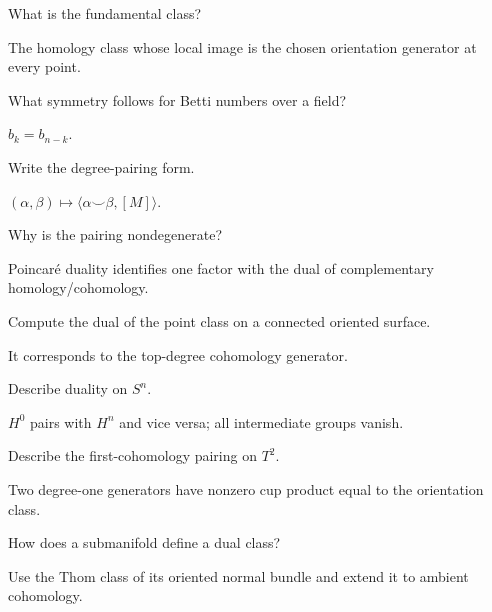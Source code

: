 \begin{problem}
What is the fundamental class?
\end{problem}
\begin{solution}
The homology class whose local image is the chosen orientation generator at every point.
\end{solution}

\begin{problem}
What symmetry follows for Betti numbers over a field?
\end{problem}
\begin{solution}
$b_k=b_{n-k}$.
\end{solution}

\begin{problem}
Write the degree-pairing form.
\end{problem}
\begin{solution}
$(\alpha,\beta)\mapsto\langle\alpha\smile\beta,[M]\rangle$.
\end{solution}

\begin{problem}
Why is the pairing nondegenerate?
\end{problem}
\begin{solution}
Poincaré duality identifies one factor with the dual of complementary homology/cohomology.
\end{solution}

\begin{problem}
Compute the dual of the point class on a connected oriented surface.
\end{problem}
\begin{solution}
It corresponds to the top-degree cohomology generator.
\end{solution}

\begin{problem}
Describe duality on $S^n$.
\end{problem}
\begin{solution}
$H^0$ pairs with $H^n$ and vice versa; all intermediate groups vanish.
\end{solution}

\begin{problem}
Describe the first-cohomology pairing on $T^2$.
\end{problem}
\begin{solution}
Two degree-one generators have nonzero cup product equal to the orientation class.
\end{solution}

\begin{problem}
How does a submanifold define a dual class?
\end{problem}
\begin{solution}
Use the Thom class of its oriented normal bundle and extend it to ambient cohomology.
\end{solution}

